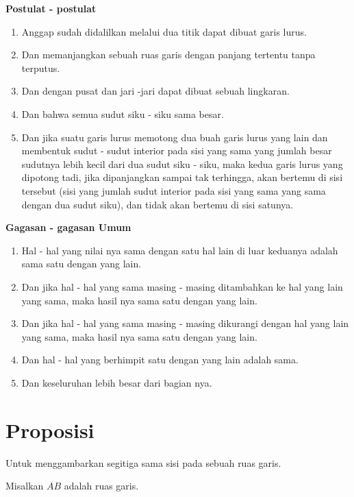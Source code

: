 \documentclass[a4paper]{book}
\begin{document}
\begin{center}
\textbf{Postulat - postulat}
\end{center}
\begin{enumerate}
\item Anggap sudah didalilkan melalui dua titik dapat dibuat garis lurus.
\item Dan memanjangkan sebuah ruas garis dengan panjang tertentu tanpa terputus.
\item Dan dengan pusat dan jari -jari dapat dibuat sebuah lingkaran.
\item Dan bahwa semua sudut siku - siku sama besar.
\item Dan jika suatu garis lurus memotong dua buah garis lurus yang lain dan 
membentuk sudut - sudut interior pada sisi yang sama yang jumlah besar 
sudutnya lebih kecil dari dua  sudut siku - siku, maka kedua garis lurus yang 
dipotong tadi, jika dipanjangkan sampai tak terhingga, akan bertemu di sisi 
tersebut (sisi yang jumlah sudut interior pada sisi yang sama yang sama dengan 
dua sudut siku), dan tidak akan bertemu di sisi satunya.
\end{enumerate}

\begin{center}
\textbf{Gagasan - gagasan Umum}
\end{center}
\begin{enumerate}
\item Hal - hal yang nilai nya sama dengan satu hal lain di luar keduanya adalah sama satu dengan yang lain. 
\item Dan jika hal - hal yang sama masing - masing ditambahkan ke hal yang lain yang sama, maka hasil nya sama satu dengan yang lain. 
\item Dan jika hal - hal yang sama masing - masing dikurangi dengan hal yang lain yang sama, maka hasil nya sama satu dengan yang lain. 
\item Dan hal - hal yang berhimpit satu dengan yang lain adalah sama.
\item Dan keseluruhan lebih besar dari bagian nya.
\end{enumerate}

\section*{\centering Proposisi \thesection}
Untuk menggambarkan segitiga sama sisi pada sebuah ruas garis.
\begin{center}
\end{center}
Misalkan $AB$ adalah ruas garis.
\end{document}
